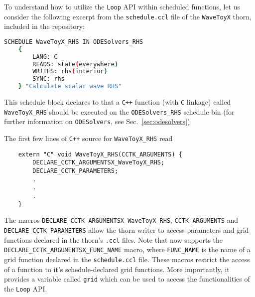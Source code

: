 
To understand how to utilize the \texttt{Loop} API within \Cactus\space scheduled functions, let us consider the following excerpt from the \texttt{schedule.ccl} file of the \texttt{WaveToyX} thorn, included in the \CarpetX\space repository:
%
\begin{lstlisting}[language=Bash]
    SCHEDULE WaveToyX_RHS IN ODESolvers_RHS
    {
        LANG: C
        READS: state(everywhere)
        WRITES: rhs(interior)
        SYNC: rhs
    } "Calculate scalar wave RHS"
\end{lstlisting}

This schedule block declares to \Cactus\space that a \texttt{C++} function (with \texttt{C} linkage) called \texttt{WaveToyX\_RHS} should be executed on the \texttt{ODESolvers\_RHS} schedule bin (for further information on \texttt{ODESolvers}, see Sec.~\ref{sec:odesolvers}).

The first few lines of \texttt{C++} source for \texttt{WaveToyX\_RHS} read
%
\begin{lstlisting}
    extern "C" void WaveToyX_RHS(CCTK_ARGUMENTS) {
        DECLARE_CCTK_ARGUMENTSX_WaveToyX_RHS;
        DECLARE_CCTK_PARAMETERS;
        .
        .
        .
    }
\end{lstlisting}
%
The macros \texttt{DECLARE\_CCTK\_ARGUMENTSX\_WaveToyX\_RHS}, \texttt{CCTK\_ARGUMENTS} and \texttt{DECLARE\_CCTK\_PARAMETERS} allow the thorn writer to access parameters and grid functions declared in the thorn's \texttt{.ccl} files. Note that \Cactus\space now supports the \texttt{DECLARE\_CCTK\_ARGUMENTSX\_FUNC\_NAME} macro, where \texttt{FUNC\_NAME} is the name of a grid function declared in the \texttt{schedule.ccl} file. These macros restrict the access of a function to it's schedule-declared grid functions. More importantly, it provides a variable called \texttt{grid} which can be used to access the functionalities of the \texttt{Loop} API.